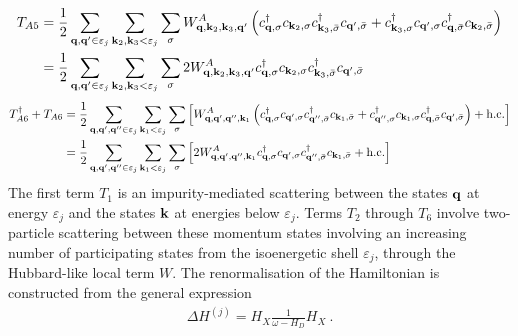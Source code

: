 \documentclass{revtex4-2}
\begin{document}
\begin{equation}\begin{aligned}
	T_{A5} &= \frac{1}{2}\sum_{{\bf q}, {\bf q}^\prime \in \varepsilon_j}\sum_{{\bf k}_2, {\bf k}_3 < \varepsilon_j}\sum_{\sigma}W^A_{{\bf q},{\bf k}_2,{\bf k}_3,{\bf q}^\prime} \left(c^\dagger_{{\bf q},\sigma}c_{{\bf k}_2,\sigma}c^\dagger_{{\bf k}_3,\bar\sigma}c_{{\bf q}^\prime,\bar\sigma} + c^\dagger_{{\bf k}_3,\sigma}c_{{\bf q}^\prime,\sigma}c^\dagger_{{\bf q},\bar\sigma}c_{{\bf k}_2,\bar\sigma}\right) \\
	       &= \frac{1}{2}\sum_{{\bf q}, {\bf q}^\prime \in \varepsilon_j}\sum_{{\bf k}_2, {\bf k}_3 < \varepsilon_j}\sum_{\sigma}2W^A_{{\bf q},{\bf k}_2,{\bf k}_3,{\bf q}^\prime} c^\dagger_{{\bf q},\sigma}c_{{\bf k}_2,\sigma}c^\dagger_{{\bf k}_3,\bar\sigma}c_{{\bf q}^\prime,\bar\sigma} \\
\end{aligned}\end{equation}
\begin{equation}\begin{aligned}
	T_{A6}^\dagger + T_{A6} &= \frac{1}{2}\sum_{{\bf q}, {\bf q}^\prime, {\bf q}^{\prime\prime} \in \varepsilon_j}\sum_{{\bf k}_1 < \varepsilon_j}\sum_{\sigma} \left[W^A_{{\bf q},{\bf q}^\prime,{\bf q}^{\prime\prime}, {\bf k}_1}\left(c^\dagger_{{\bf q},\sigma}c_{{\bf q}^\prime,\sigma}c^\dagger_{{\bf q}^{\prime\prime},\bar\sigma}c_{{\bf k}_1,\bar\sigma} + c^\dagger_{{\bf q}^{\prime\prime},\sigma}c_{{\bf k}_1,\sigma}c^\dagger_{{\bf q},\bar\sigma}c_{{\bf q}^\prime,\bar\sigma}\right) + \text{h.c.}\right]\\
				&= \frac{1}{2}\sum_{{\bf q}, {\bf q}^\prime, {\bf q}^{\prime\prime} \in \varepsilon_j}\sum_{{\bf k}_1 < \varepsilon_j}\sum_{\sigma} \left[2W^A_{{\bf q},{\bf q}^\prime,{\bf q}^{\prime\prime}, {\bf k}_1}c^\dagger_{{\bf q},\sigma}c_{{\bf q}^\prime,\sigma}c^\dagger_{{\bf q}^{\prime\prime},\bar\sigma}c_{{\bf k}_1,\bar\sigma} + \text{h.c.}\right]\\
\end{aligned}\end{equation}
The first term \(T_1\) is an impurity-mediated scattering between the states \({\bf q}\) at energy \(\varepsilon_j\) and the states \({\bf k}\) at energies below \(\varepsilon_j\). Terms \(T_2\) through \(T_6\) involve two-particle scattering between these momentum states involving an increasing number of participating states from the isoenergetic shell \(\varepsilon_j\), through the Hubbard-like local term \(W\). The renormalisation of the Hamiltonian is constructed from the general expression
\begin{equation}\begin{aligned}
	\Delta H^{(j)} = H_X \frac{1}{\omega- H_D} H_X~.
\end{aligned}\end{equation}
\end{document}
